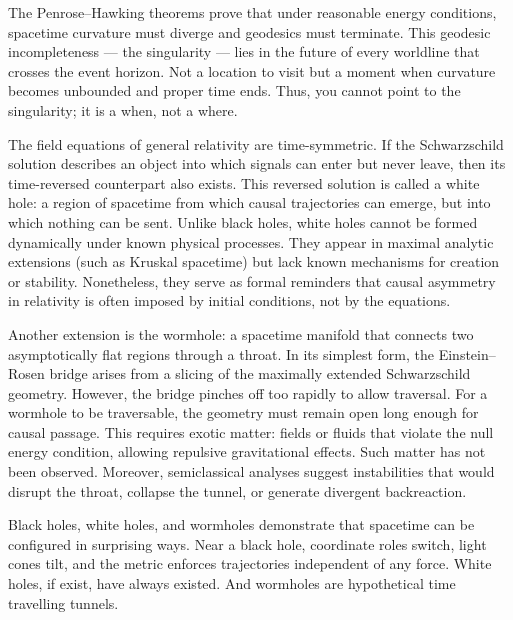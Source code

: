 The Penrose–Hawking theorems prove that under reasonable energy conditions, spacetime curvature must diverge and geodesics must terminate. This geodesic incompleteness — the singularity — lies in the future of every worldline that crosses the event horizon. Not a location to visit but a moment when curvature becomes unbounded and proper time ends. Thus, you cannot point to the singularity; it is a when, not a where. 

The field equations of general relativity are time-symmetric. If the Schwarzschild solution describes an object into which signals can enter but never leave, then its time-reversed counterpart also exists. This reversed solution is called a white hole: a region of spacetime from which causal trajectories can emerge, but into which nothing can be sent. Unlike black holes, white holes cannot be formed dynamically under known physical processes. They appear in maximal analytic extensions (such as Kruskal spacetime) but lack known mechanisms for creation or stability. Nonetheless, they serve as formal reminders that causal asymmetry in relativity is often imposed by initial conditions, not by the equations.

Another extension is the wormhole: a spacetime manifold that connects two asymptotically flat regions through a throat. In its simplest form, the Einstein–Rosen bridge arises from a slicing of the maximally extended Schwarzschild geometry. However, the bridge pinches off too rapidly to allow traversal. For a wormhole to be traversable, the geometry must remain open long enough for causal passage. This requires exotic matter: fields or fluids that violate the null energy condition, allowing repulsive gravitational effects. Such matter has not been observed. Moreover, semiclassical analyses suggest instabilities that would disrupt the throat, collapse the tunnel, or generate divergent backreaction.

Black holes, white holes, and wormholes demonstrate that spacetime can be configured in surprising ways. Near a black hole, coordinate roles switch, light cones tilt, and the metric enforces trajectories independent of any force. White holes, if exist, have always existed. And wormholes are hypothetical time travelling tunnels.

\newpage

